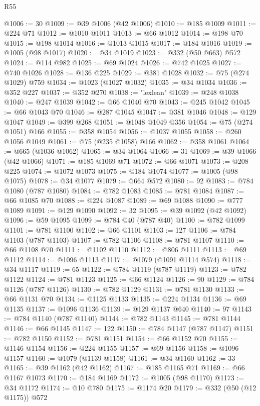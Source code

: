 \begin{lexlean}{R55}
\begin{coremodule}
@1006 := 30
@1009 := @39 @1006 (@42 @1006)
@1010 := @185 @1009
@1011 := @224 @71
@1012 := @1010 @1011
@1013 := @66 @1012
@1014 := @198 @70
@1015 := @198 @1014
@1016 := @1013 @1015
@1017 := @184 @1016
@1019 := @1005 (@98 @1017)
@1020 := @34 @1019
@1023 := @332 (@50 @663) @572
@1024 := @114 @982
@1025 := @69 @1024
@1026 := @742 @1025
@1027 := @740 @1026
@1028 := @136 @225
@1029 := @381 @1028
@1032 := @75 (@274 @1029) @759
@1034 := @1023 (@1027 @1032)
@1035 := @34 @1034
@1036 := @352 @227
@1037 := @352 @270
@1038 := "lexlean"
@1039 := @248 @1038
@1040 := @247 @1039
@1042 := @66 @1040 @70
@1043 := @245 @1042
@1045 := @66 @1043 @70
@1046 := @287 @1045
@1047 := @381 @1046
@1048 := @129 @1047
@1049 := @399 @268
@1051 := @1048 @1049 @356
@1054 := @75 (@274 @1051) @166
@1055 := @358 @1054
@1056 := @1037 @1055
@1058 := @260 @1056 @1049
@1061 := @75 (@235 @1058) @166
@1062 := @358 @1061
@1064 := @665 (@1036 @1062)
@1065 := @34 @1064
@1066 := 31
@1069 := @39 @1066 (@42 @1066)
@1071 := @185 @1069 @71
@1072 := @66 @1071
@1073 := @208 @225
@1074 := @1072 @1073
@1075 := @184 @1074
@1077 := @1005 (@98 @1075)
@1078 := @34 @1077
@1079 := @664 @572
@1080 := 92
@1083 := @784 @1080 (@787 @1080)
@1084 := @782 @1083
@1085 := @781 @1084
@1087 := @66 @1085 @70
@1088 := @224 @1087
@1089 := @69 @1088
@1090 := @777 @1089
@1091 := @129 @1090
@1092 := 32
@1095 := @39 @1092 (@42 @1092)
@1096 := @59 @1095
@1099 := @784 @40 (@787 @40)
@1100 := @782 @1099
@1101 := @781 @1100
@1102 := @66 @1101
@1103 := 127
@1106 := @784 @1103 (@787 @1103)
@1107 := @782 @1106
@1108 := @781 @1107
@1110 := @66 @1108 @70
@1111 := @1102 @1110
@1112 := @806 @1111
@1113 := @69 @1112
@1114 := @1096 @1113
@1117 := @1079 (@1091 @1114 @574)
@1118 := @34 @1117
@1119 := 65
@1122 := @784 @1119 (@787 @1119)
@1123 := @782 @1122
@1124 := @781 @1123
@1125 := @66 @1124
@1126 := 90
@1129 := @784 @1126 (@787 @1126)
@1130 := @782 @1129
@1131 := @781 @1130
@1133 := @66 @1131 @70
@1134 := @1125 @1133
@1135 := @224 @1134
@1136 := @69 @1135
@1137 := @1096 @1136
@1139 := @129 @1137 @640
@1140 := 97
@1143 := @784 @1140 (@787 @1140)
@1144 := @782 @1143
@1145 := @781 @1144
@1146 := @66 @1145
@1147 := 122
@1150 := @784 @1147 (@787 @1147)
@1151 := @782 @1150
@1152 := @781 @1151
@1154 := @66 @1152 @70
@1155 := @1146 @1154
@1156 := @224 @1155
@1157 := @69 @1156
@1158 := @1096 @1157
@1160 := @1079 (@1139 @1158)
@1161 := @34 @1160
@1162 := 33
@1165 := @39 @1162 (@42 @1162)
@1167 := @185 @1165 @71
@1169 := @66 @1167 @1073
@1170 := @184 @1169
@1172 := @1005 (@98 @1170)
@1173 := @34 @1172
@1174 := @10 @780
@1175 := @1174 @20
@1179 := @332 (@50 (@12 @1175)) @572

\end{coremodule}
\end{lexlean}
